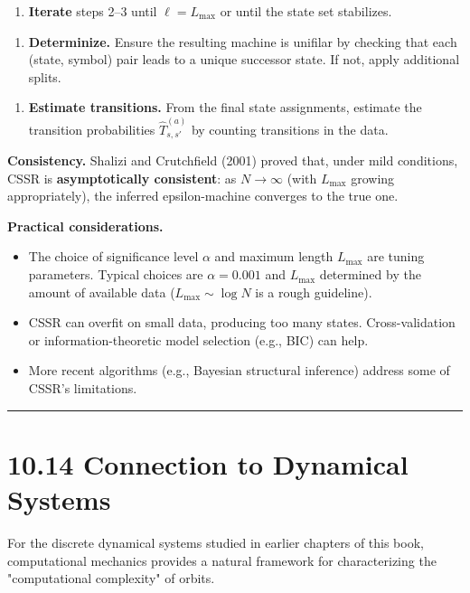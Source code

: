 \begin{enumerate}
  \item \textbf{Iterate} steps 2--3 until $\ell = L_{\max}$ or until the state set stabilizes.
\end{enumerate}

\begin{enumerate}
  \item \textbf{Determinize.} Ensure the resulting machine is unifilar by checking that each (state, symbol) pair leads to a unique successor state. If not, apply additional splits.
\end{enumerate}

\begin{enumerate}
  \item \textbf{Estimate transitions.} From the final state assignments, estimate the transition probabilities $\hat{T}^{(a)}_{s,s'}$ by counting transitions in the data.
\end{enumerate}

\textbf{Consistency.} Shalizi and Crutchfield (2001) proved that, under mild conditions, CSSR is \textbf{asymptotically consistent}: as $N \to \infty$ (with $L_{\max}$ growing appropriately), the inferred epsilon-machine converges to the true one.

\textbf{Practical considerations.}
\begin{itemize}
  \item The choice of significance level $\alpha$ and maximum length $L_{\max}$ are tuning parameters. Typical choices are $\alpha = 0.001$ and $L_{\max}$ determined by the amount of available data ($L_{\max} \sim \log N$ is a rough guideline).
  \item CSSR can overfit on small data, producing too many states. Cross-validation or information-theoretic model selection (e.g., BIC) can help.
  \item More recent algorithms (e.g., Bayesian structural inference) address some of CSSR's limitations.
\end{itemize}

\bigskip\hrule\bigskip

\section{10.14 Connection to Dynamical Systems}

For the discrete dynamical systems studied in earlier chapters of this book, computational mechanics provides a natural framework for characterizing the "computational complexity" of orbits.

